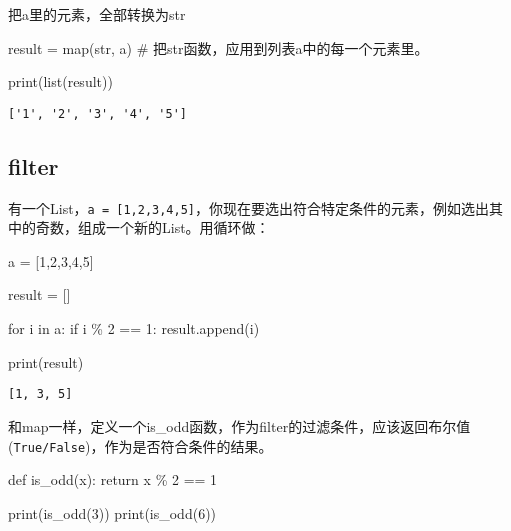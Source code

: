 \documentclass[
  letterpaper,
  DIV=11,
  numbers=noendperiod]{scrreprt}
\newenvironment{Shaded}{\begin{snugshade}}{\end{snugshade}}
\newcommand{\BuiltInTok}[1]{\textcolor[rgb]{0.00,0.23,0.31}{#1}}
\newcommand{\CommentTok}[1]{\textcolor[rgb]{0.37,0.37,0.37}{#1}}
\newcommand{\ControlFlowTok}[1]{\textcolor[rgb]{0.00,0.23,0.31}{#1}}
\newcommand{\DecValTok}[1]{\textcolor[rgb]{0.68,0.00,0.00}{#1}}
\newcommand{\KeywordTok}[1]{\textcolor[rgb]{0.00,0.23,0.31}{#1}}
\newcommand{\NormalTok}[1]{\textcolor[rgb]{0.00,0.23,0.31}{#1}}
\newcommand{\OperatorTok}[1]{\textcolor[rgb]{0.37,0.37,0.37}{#1}}
\begin{document}
把a里的元素，全部转换为str

\begin{Shaded}
\begin{Highlighting}[]
\NormalTok{result }\OperatorTok{=} \BuiltInTok{map}\NormalTok{(}\BuiltInTok{str}\NormalTok{, a) }\CommentTok{\# 把str函数，应用到列表a中的每一个元素里。}

\BuiltInTok{print}\NormalTok{(}\BuiltInTok{list}\NormalTok{(result))}
\end{Highlighting}
\end{Shaded}

\begin{verbatim}
['1', '2', '3', '4', '5']
\end{verbatim}

\hypertarget{filter}{%
\subsection{filter}\label{filter}}

有一个List，\texttt{a\ =\ {[}1,2,3,4,5{]}}，你现在要选出符合特定条件的元素，例如选出其中的奇数，组成一个新的List。用循环做：

\begin{Shaded}
\begin{Highlighting}[]
\NormalTok{a }\OperatorTok{=}\NormalTok{ [}\DecValTok{1}\NormalTok{,}\DecValTok{2}\NormalTok{,}\DecValTok{3}\NormalTok{,}\DecValTok{4}\NormalTok{,}\DecValTok{5}\NormalTok{]}

\NormalTok{result }\OperatorTok{=}\NormalTok{ []}

\ControlFlowTok{for}\NormalTok{ i }\KeywordTok{in}\NormalTok{ a:}
  \ControlFlowTok{if}\NormalTok{ i }\OperatorTok{\%} \DecValTok{2} \OperatorTok{==} \DecValTok{1}\NormalTok{:}
\NormalTok{    result.append(i)}
      
\BuiltInTok{print}\NormalTok{(result)}
\end{Highlighting}
\end{Shaded}

\begin{verbatim}
[1, 3, 5]
\end{verbatim}

和map一样，定义一个is\_odd函数，作为filter的过滤条件，应该返回布尔值(\texttt{True/False})，作为是否符合条件的结果。

\begin{Shaded}
\begin{Highlighting}[]
\KeywordTok{def}\NormalTok{ is\_odd(x):}
    \ControlFlowTok{return}\NormalTok{ x }\OperatorTok{\%} \DecValTok{2} \OperatorTok{==} \DecValTok{1}

\BuiltInTok{print}\NormalTok{(is\_odd(}\DecValTok{3}\NormalTok{))}
\BuiltInTok{print}\NormalTok{(is\_odd(}\DecValTok{6}\NormalTok{))}
\end{Highlighting}
\end{Shaded}
\end{document}
